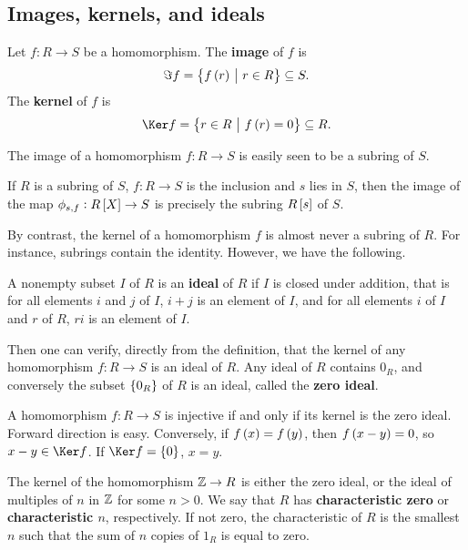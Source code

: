 \subsection{Images, kernels, and ideals}

\begin{definition}
Let $ f : R \to S $ be a homomorphism. The \textbf{image} of $ f $ is
$$ \Im f = \cbr{f\br{r} \st r \in R} \subseteq S. $$
The \textbf{kernel} of $ f $ is
$$ \Ker f = \cbr{r \in R \st f\br{r} = 0} \subseteq R. $$
\end{definition}

The image of a homomorphism $ f : R \to S $ is easily seen to be a subring of $ S $.

\begin{example*}
If $ R $ is a subring of $ S $, $ f : R \to S $ is the inclusion and $ s $ lies in $ S $, then the image of the map $ \phi_{s, f} : R\sbr{X} \to S $ is precisely the subring $ R\sbr{s} $ of $ S $.
\end{example*}

By contrast, the kernel of a homomorphism $ f $ is almost never a subring of $ R $. For instance, subrings contain the identity. However, we have the following.


\begin{definition}
A nonempty subset $ I $ of $ R $ is an \textbf{ideal} of $ R $ if $ I $ is closed under addition, that is for all elements $ i $ and $ j $ of $ I $, $ i + j $ is an element of $ I $, and for all elements $ i $ of $ I $ and $ r $ of $ R $, $ ri $ is an element of $ I $.
\end{definition}

Then one can verify, directly from the definition, that the kernel of any homomorphism $ f : R \to S $ is an ideal of $ R $. Any ideal of $ R $ contains $ 0_R $, and conversely the subset $ \cbr{0_R} $ of $ R $ is an ideal, called the \textbf{zero ideal}.

\begin{note*}
A homomorphism $ f : R \to S $ is injective if and only if its kernel is the zero ideal. Forward direction is easy. Conversely, if $ f\br{x} = f\br{y} $, then $ f\br{x - y} = 0 $, so $ x - y \in \Ker f $. If $ \Ker f = \cbr{0} $, $ x = y $.
\end{note*}

The kernel of the homomorphism $ \mathbb{Z} \to R $ is either the zero ideal, or the ideal of multiples of $ n $ in $ \mathbb{Z} $ for some $ n > 0 $. We say that $ R $ has \textbf{characteristic zero} or \textbf{characteristic $ n $}, respectively. If not zero, the characteristic of $ R $ is the smallest $ n $ such that the sum of $ n $ copies of $ 1_R $ is equal to zero.

